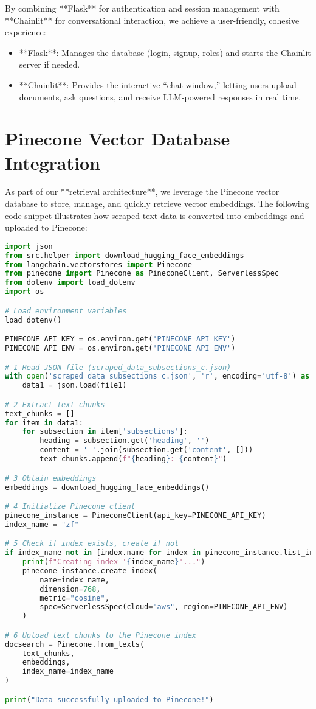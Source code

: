\noindent
By combining **Flask** for authentication and session management with **Chainlit** for conversational interaction, we achieve a user-friendly, cohesive experience:
\begin{itemize}
    \item **Flask**: Manages the database (login, signup, roles) and starts the Chainlit server if needed.
    \item **Chainlit**: Provides the interactive “chat window,” letting users upload documents, ask questions, and receive LLM-powered responses in real time.
\end{itemize}

\section{Pinecone Vector Database Integration}
\label{sec:pinecone-db}

As part of our **retrieval architecture**, we leverage the Pinecone vector database to store, manage, and quickly
retrieve vector embeddings. The following code snippet illustrates how scraped text data is converted into embeddings and
uploaded to Pinecone:

\begin{lstlisting}[language=Python, caption={Storing Scraped Data in Pinecone}, basicstyle=\small\ttfamily]
import json
from src.helper import download_hugging_face_embeddings
from langchain.vectorstores import Pinecone
from pinecone import Pinecone as PineconeClient, ServerlessSpec
from dotenv import load_dotenv
import os

# Load environment variables
load_dotenv()

PINECONE_API_KEY = os.environ.get('PINECONE_API_KEY')
PINECONE_API_ENV = os.environ.get('PINECONE_API_ENV')

# 1 Read JSON file (scraped_data_subsections_c.json)
with open('scraped_data_subsections_c.json', 'r', encoding='utf-8') as file1:
    data1 = json.load(file1)

# 2 Extract text chunks
text_chunks = []
for item in data1:
    for subsection in item['subsections']:
        heading = subsection.get('heading', '')
        content = ' '.join(subsection.get('content', []))
        text_chunks.append(f"{heading}: {content}")

# 3 Obtain embeddings
embeddings = download_hugging_face_embeddings()

# 4 Initialize Pinecone client
pinecone_instance = PineconeClient(api_key=PINECONE_API_KEY)
index_name = "zf"

# 5 Check if index exists, create if not
if index_name not in [index.name for index in pinecone_instance.list_indexes()]:
    print(f"Creating index '{index_name}'...")
    pinecone_instance.create_index(
        name=index_name,
        dimension=768,
        metric="cosine",
        spec=ServerlessSpec(cloud="aws", region=PINECONE_API_ENV)
    )

# 6 Upload text chunks to the Pinecone index
docsearch = Pinecone.from_texts(
    text_chunks,
    embeddings,
    index_name=index_name
)

print("Data successfully uploaded to Pinecone!")
\end{lstlisting}

